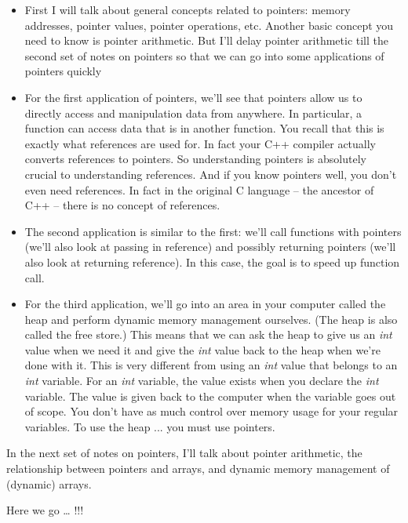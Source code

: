 \begin{itemize}

\item
  First I will talk about general concepts related to pointers: memory
  addresses, pointer values, pointer operations, etc. Another basic
  concept you need to know is pointer arithmetic. But I'll delay pointer
  arithmetic till the second set of notes on pointers so that we can go
  into some applications of pointers quickly
\item
  For the first application of pointers, we'll see that pointers allow
  us to directly access and manipulation data from anywhere. In
  particular, a function can access data that is in another function.
  You recall that this is exactly what references are used for. In fact
  your C++ compiler actually converts references to pointers. So
  understanding pointers is absolutely crucial to understanding
  references. And if you know pointers well, you don't even need
  references. In fact in the original C language -- the ancestor of C++
  -- there is no concept of references.
\item
  The second application is similar to the first: we'll call functions
  with pointers (we'll also look at passing in reference) and possibly
  returning pointers (we'll also look at returning reference). In this
  case, the goal is to speed up function call.
\item
  For the third application, we'll go into an area in your computer
  called the heap and perform dynamic memory management ourselves. (The
  heap is also called the free store.) This means that we can ask the
  heap to give us an \emph{int} value when we need it and give the
  \emph{int} value back to the heap when we're done with it. This is
  very different from using an \emph{int} value that belongs to an
  \emph{int} variable. For an \emph{int} variable, the value exists when
  you declare the \emph{int} variable. The value is given back to the
  computer when the variable goes out of scope. You don't have as much
  control over memory usage for your regular variables. To use the heap
  ... you must use pointers.
\end{itemize}

In the next set of notes on pointers, I'll talk about pointer arithmetic, the relationship between pointers and arrays, and dynamic memory management of (dynamic) arrays.

Here we go \ldots{} !!!


